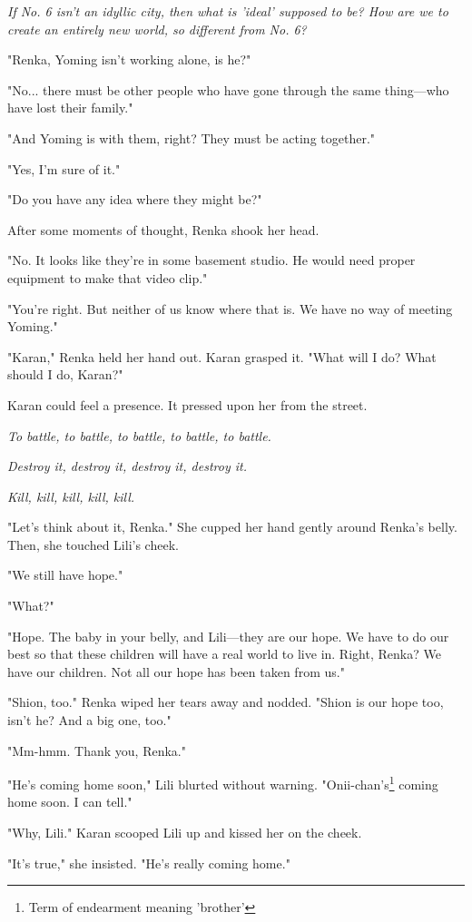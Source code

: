 \emph{If No. 6 isn't an idyllic city, then what is 'ideal' supposed to be? How
are we to create an entirely new world, so different from No. 6?}

"Renka, Yoming isn't working alone, is he?"

"No... there must be other people who have gone through the same
thing---who have lost their family."

"And Yoming is with them, right? They must be acting together."

"Yes, I'm sure of it."

"Do you have any idea where they might be?"

After some moments of thought, Renka shook her head.

"No. It looks like they're in some basement studio. He would need proper
equipment to make that video clip."

"You're right. But neither of us know where that is. We have no way of
meeting Yoming."

"Karan," Renka held her hand out. Karan grasped it. "What will I do?
What should I do, Karan?"

Karan could feel a presence. It pressed upon her from the street.

\emph{To battle, to battle, to battle, to battle, to battle.}

\emph{Destroy it, destroy it, destroy it, destroy it.}

\emph{Kill, kill, kill, kill, kill.}

"Let's think about it, Renka." She cupped her hand gently around Renka's
belly. Then, she touched Lili's cheek.

"We still have hope."

"What?"

"Hope. The baby in your belly, and Lili---they are our hope. We have to do
our best so that these children will have a real world to live in.
Right, Renka? We have our children. Not all our hope has been taken from
us."

"Shion, too." Renka wiped her tears away and nodded. "Shion is our hope
too, isn't he? And a big one, too."

"Mm-hmm. Thank you, Renka."

"He's coming home soon," Lili blurted without warning. "Onii-chan's\footnote{Term of endearment meaning 'brother'}
coming home soon. I can tell."

"Why, Lili." Karan scooped Lili up and kissed her on the cheek.

"It's true," she insisted. "He's really coming home."

